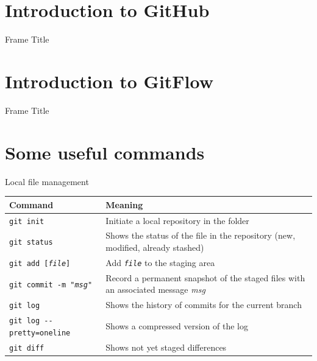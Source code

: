 \documentclass{beamer}
\begin{document}
\section{Introduction to GitHub}
\begin{frame}{Frame Title}
\end{frame}

\section{Introduction to GitFlow}
\begin{frame}{Frame Title}
\end{frame}

\section{Some useful commands}
\begin{frame}{Local file management}
\begin{table}
    \scriptsize
    \centering
    \begin{tabular}{p{}p{}}
        \toprule
        \alert{Command}	&	\alert{Meaning}\\
        \midrule
        \texttt{git init}	&	Initiate a local repository in the folder\\
        \texttt{git status}	&	Shows the status of the file in the repository (new, modified, already stashed)\\
        \texttt{git add [\textit{file}]}	&	Add \texttt{\textit{file}} to the staging area\\
        \texttt{git commit -m "\textit{msg}"} & Record a permanent snapshot of the staged files with an associated message \textit{msg}\\
        \texttt{git log}	&	Shows the history of commits for the current branch\\
        \texttt{git log -{}-pretty=oneline}	&	Shows a compressed version of the log\\
        \texttt{git diff}	&	Shows not yet staged differences\\
        \bottomrule
    \end{tabular}
\end{table}
\end{frame}
\end{document}
